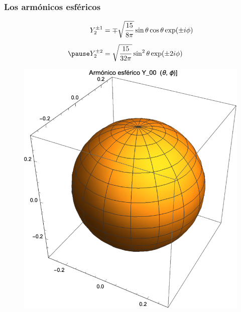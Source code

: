 \documentclass[12pt]{beamer}
\begin{document}
\begin{frame}
\frametitle{Los armónicos esféricos}
\begin{eqnarray*}
\begin{aligned}
Y_{2}^{\pm 1} &= \mp \sqrt{\dfrac{15}{8 \pi}} \sin \theta \cos \theta \exp(\pm i \phi) \\[0.5em] \pause
Y_{2}^{\pm 2} &= \sqrt{\dfrac{15}{32 \pi}} \sin^{2} \theta \exp(\pm 2 i \phi)
\end{aligned}
\end{eqnarray*}
\end{frame}
\begin{frame}[plain]
\begin{figure}
    \centering
    \includegraphics[scale=0.65]{Imagenes/Armonicos_Esfericos_00.eps}
\end{figure}
\end{frame}
\end{document}
